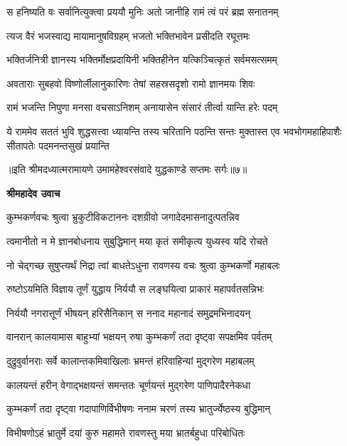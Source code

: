 \twolineshloka
{स हनिष्यति वः सर्वानित्युक्त्वा प्रययौ मुनिः}
{अतो जानीहि रामं त्वं परं ब्रह्म सनातनम्} %

\twolineshloka
{त्यज वैरं भजस्वाद्य मायामानुषविग्रहम्}
{भजतो भक्तिभावेन प्रसीदति रघूत्तमः} %

\twolineshloka
{भक्तिर्जनित्री ज्ञानस्य भक्तिर्मोक्षप्रदायिनी}
{भक्तिहीनेन यत्किञ्चित्कृतं सर्वमसत्समम्} %

\twolineshloka
{अवताराः सुबहवो विष्णोर्लीलानुकारिणः}
{तेषां सहस्रसदृशो रामो ज्ञानमयः शिवः} %

\twolineshloka
{रामं भजन्ति निपुणा मनसा वचसाऽनिशम्}
{अनायासेन संसारं तीर्त्वा यान्ति हरेः पदम्} %

\fourlineindentedshloka
{ये राममेव सततं भुवि शुद्धसत्त्वा}
{ध्यायन्ति तस्य चरितानि पठन्ति सन्तः}
{मुक्तास्त एव भवभोगमहाहिपाशैः}
{सीतापतेः पदमनन्तसुखं प्रयान्ति} %

{॥इति श्रीमदध्यात्मरामायणे उमामहेश्वरसंवादे युद्धकाण्डे सप्तमः
सर्गः॥७॥
}




\textbf{श्रीमहादेव उवाच}

\twolineshloka
{कुम्भकर्णवचः श्रुत्वा भ्रुकुटीविकटाननः}
{दशग्रीवो जगादेदमासनादुत्पतन्निव} %

\twolineshloka
{त्वमानीतो न मे ज्ञानबोधनाय सुबुद्धिमान्}
{मया कृतं समीकृत्य युध्यस्व यदि रोचते} %

\twolineshloka
{नो चेद्गच्छ सुषुप्त्यर्थं निद्रा त्वां बाधतेऽधुना}
{रावणस्य वचः श्रुत्वा कुम्भकर्णो महाबलः} %

\twolineshloka
{रुष्टोऽयमिति विज्ञाय तूर्णं युद्धाय निर्ययौ}
{स लङ्घयित्वा प्राकारं महापर्वतसन्निभः} %

\twolineshloka
{निर्ययौ नगरात्तूर्णं भीषयन् हरिसैनिकान्}
{स ननाद महानादं समुद्रमभिनादयन्} %

\twolineshloka
{वानरान् कालयामास बाहुभ्यां भक्षयन् रुषा}
{कुम्भकर्णं तदा दृष्ट्वा सपक्षमिव पर्वतम्} %

\twolineshloka
{दुद्रुवुर्वानराः सर्वे कालान्तकमिवाखिलाः}
{भ्रमन्तं हरिवाहिन्यां मुद्गरेण महाबलम्} %

\twolineshloka
{कालयन्तं हरीन् वेगाद्भक्षयन्तं समन्ततः}
{चूर्णयन्तं मुद्गरेण पाणिपादैरनेकधा} %

\twolineshloka
{कुम्भकर्णं तदा दृष्ट्वा गदापाणिर्विभीषणः}
{ननाम चरणं तस्य भ्रातुर्ज्येष्ठस्य बुद्धिमान्} %

\twolineshloka
{विभीषणोऽहं भ्रातुर्मे दयां कुरु महामते}
{रावणस्तु मया भ्रातर्बहुधा परिबोधितः} %

